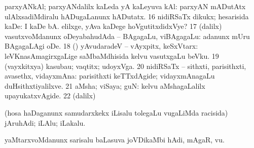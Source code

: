 {{   parxyANkAl; parxyANdalilx kaLeda yA kaLeyuva kAl:  parxyAN mADutAtx ulAlxsadiMdiralu
hADugaLanunx hADutatx. 
\num{16} nidiRSaTx dikukx; hesarisida kaDe:  I kaDe
bA.  elilxge, yAva kaDege
hoVgutitxdidxVye? 
\num{17} (\bava dalilx) vasutxvoMdanunx oDeyabahudAda -- BAgagaLu,
viBAgagaLu:  adanunx mUru BAgagaLAgi oDe. 
\num{18} (\AmA) yAvudaradeV -- vAyxpitx, keSxVtarx:  leVKnasAmagirxgaLige saMbaMdhisida
kelvu vasutxgaLu beVku. 
\num{19} (vayxkitxya) kasubau; vaqtitx; udoyxVga. 
\num{20} nidiRSaTx -- sithxti, parisithxti, avasethx, vidayxmAna:
 parisithxti keTTxdAgide; vidayxmAnagaLu
duHsithxtiyalilxve. 
\num{21} aMsha; viSaya; guN:  kelvu
aMshagaLalilx upayukatxvAgide. 
\num{22} (\bava dalilx) 

  (hosa haDaganunx samudarxkekx iLisalu tolegaLu \mo
vugaLiMda racisida) jAruhAdi; iLAlu; iLakalu. 

  yaMtarxvoMdanunx sarisalu baLasuva joVDikaMbi hAdi, mAgaR,
\mo vu.}} 
 
